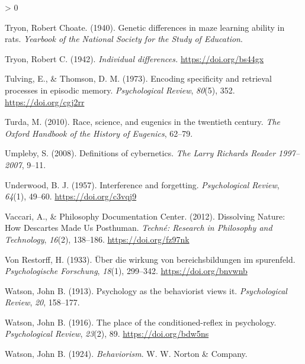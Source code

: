 \documentclass[
  oneside,
  12pt]{crumpbook}
\newlength{\cslhangindent}
\newenvironment{CSLReferences}[2] %
 {%
  \setlength{\parindent}{0pt}
  \ifodd #1 \everypar{\setlength{\hangindent}{\cslhangindent}}\ignorespaces\fi
  \ifnum #2 > 0
  \setlength{\parskip}{#2\baselineskip}
  \fi
 }%
 {}
\begin{document}
\begin{CSLReferences}{1}{0}
\leavevmode\hypertarget{ref-tryonGeneticDifferencesMaze1940}{}%
Tryon, Robert Choate. (1940). Genetic differences in maze learning ability in rats. \emph{Yearbook of the National Society for the Study of Education}.

\leavevmode\hypertarget{ref-tryonIndividualDifferences1942}{}%
Tryon, Robert C. (1942). \emph{Individual differences.} \url{https://doi.org/bs44gx}

\leavevmode\hypertarget{ref-tulvingEncodingSpecificityRetrieval1973}{}%
Tulving, E., \& Thomson, D. M. (1973). Encoding specificity and retrieval processes in episodic memory. \emph{Psychological Review}, \emph{80}(5), 352. \url{https://doi.org/cgj2rr}

\leavevmode\hypertarget{ref-turdaRaceScienceEugenics2010}{}%
Turda, M. (2010). Race, science, and eugenics in the twentieth century. \emph{The Oxford Handbook of the History of Eugenics}, 62--79.

\leavevmode\hypertarget{ref-umplebyDefinitionsCybernetics2008}{}%
Umpleby, S. (2008). Definitions of cybernetics. \emph{The Larry Richards Reader 1997--2007}, 9--11.

\leavevmode\hypertarget{ref-underwoodInterferenceForgetting1957}{}%
Underwood, B. J. (1957). Interference and forgetting. \emph{Psychological Review}, \emph{64}(1), 49--60. \url{https://doi.org/c3vqj9}

\leavevmode\hypertarget{ref-vaccariDissolvingNatureHow2012}{}%
Vaccari, A., \& Philosophy Documentation Center. (2012). Dissolving {Nature}: {How Descartes Made Us Posthuman}. \emph{Techné: Research in Philosophy and Technology}, \emph{16}(2), 138--186. \url{https://doi.org/fz97nk}

\leavevmode\hypertarget{ref-vonrestorffUberWirkungBereichsbildungen1933}{}%
Von Restorff, H. (1933). Über die wirkung von bereichsbildungen im spurenfeld. \emph{Psychologische Forschung}, \emph{18}(1), 299--342. \url{https://doi.org/bnvwnb}

\leavevmode\hypertarget{ref-watsonPsychologyBehavioristViews1913}{}%
Watson, John B. (1913). Psychology as the behaviorist views it. \emph{Psychological Review}, \emph{20}, 158--177.

\leavevmode\hypertarget{ref-watsonPlaceConditionedreflexPsychology1916}{}%
Watson, John B. (1916). The place of the conditioned-reflex in psychology. \emph{Psychological Review}, \emph{23}(2), 89. \url{https://doi.org/bdw5ns}

\leavevmode\hypertarget{ref-watsonBehaviorism1924}{}%
Watson, John B. (1924). \emph{Behaviorism}. {W. W. Norton \& Company}.


\end{CSLReferences}
\end{document}
